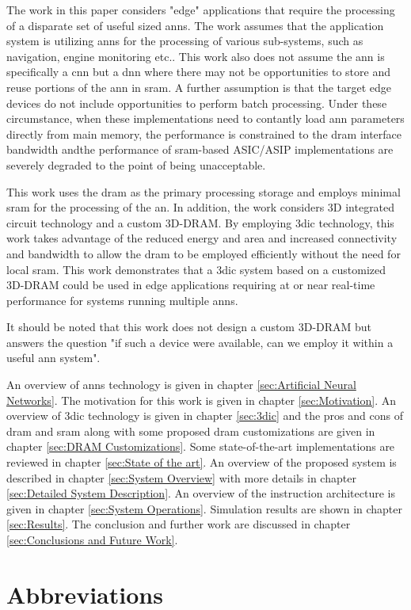 The work in this paper considers "edge" applications that require the processing of a disparate set of useful sized \ac{ann}s. The work assumes that the application system is utilizing \ac{ann}s
for the processing of various sub-systems, such as navigation, engine monitoring etc.. This work also does not assume the \ac{ann} is specifically a \ac{cnn} but a \ac{dnn} where there may
not be opportunities to store and reuse portions of the \ac{ann} in \ac{sram}. A further assumption is that the target edge devices do not include opportunities to perform batch processing.
Under these circumstance, when these implementations need to contantly load \ac{ann} parameters directly from main memory, the performance is constrained to the \ac{dram} interface bandwidth andthe performance of \ac{sram}-based ASIC/ASIP implementations are severely degraded to the point of being unacceptable.

This work uses the \ac{dram} as the primary processing storage and employs minimal \ac{sram} for the processing of the \ac{an}.
In addition, the work considers 3D integrated circuit technology and a custom 3D-DRAM. By employing \ac{3dic} technology, this work takes advantage of the reduced energy and area and increased
connectivity and bandwidth to allow the \ac{dram} to be employed efficiently without the need for local \ac{sram}.
This work demonstrates that a \ac{3dic} system based on a customized 3D-DRAM could be used in edge applications requiring at or near real-time performance for systems running multiple \ac{ann}s.

It should be noted that this work does not design a custom 3D-DRAM but answers the question "if such a device were available, can we employ it within a useful \ac{ann} system".

\hfill %

An overview of \acp{ann} technology is given in chapter \ref{sec:Artificial Neural Networks}.
The motivation for this work is given in chapter \ref{sec:Motivation}.
An overview of \ac{3dic} technology is given in chapter \ref{sec:3dic} and the pros and cons of \ac{dram} and \ac{sram} along with some proposed \ac{dram} customizations are given in chapter \ref{sec:DRAM Customizations}.
Some state-of-the-art implementations are reviewed in chapter \ref{sec:State of the art}.
An overview of the proposed system is described in chapter \ref{sec:System Overview} with more details in chapter \ref{sec:Detailed System Description}.
An overview of the instruction architecture is given in chapter \ref{sec:System Operations}.
Simulation results are shown in chapter \ref{sec:Results}.
The conclusion and further work are discussed in chapter \ref{sec:Conclusions and Future Work}.


\section[Abbreviations]{Abbreviations}
\label{sec:Abbreviations}

\printacronyms[include-classes=abbrev,name={Acronyms}]

